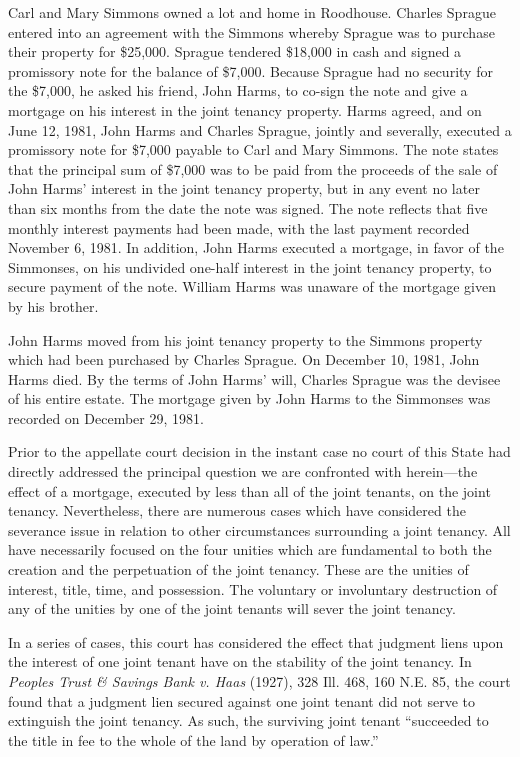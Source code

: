 Carl and Mary Simmons owned a lot and home in Roodhouse. Charles Sprague entered
into an agreement with the Simmons whereby Sprague was to purchase their
property for \$25,000. Sprague tendered \$18,000 in cash and signed a
promissory note for the balance of \$7,000. Because Sprague had no security for
the \$7,000, he asked his friend, John Harms, to co-sign the note and give a
mortgage on his interest in the joint tenancy property. Harms agreed, and on
June 12, 1981, John Harms and Charles Sprague, jointly and severally, executed
a promissory note for \$7,000 payable to Carl and Mary Simmons. The note states
that the principal sum of \$7,000 was to be paid from the proceeds of the sale
of John Harms' interest in the joint tenancy property, but in any event no
later than six months from the date the note was signed. The note reflects that
five monthly interest payments had been made, with the last payment recorded
November 6, 1981. In addition, John Harms executed a mortgage, in favor of the
Simmonses, on his undivided one-half interest in the joint tenancy property, to
secure payment of the note. William Harms was unaware of the mortgage given by
his brother.

John Harms moved from his joint tenancy property to the Simmons property which
had been purchased by Charles Sprague. On December 10, 1981, John Harms died.
By the terms of John Harms' will, Charles Sprague was the devisee of his entire
estate. The mortgage given by John Harms to the Simmonses was recorded on
December 29, 1981.

Prior to the appellate court decision in the instant case no court of this State
had directly addressed the principal question we are confronted with
herein---the
effect of a mortgage, executed by less than all of the joint tenants, on the
joint tenancy. Nevertheless, there are numerous cases which have considered the
severance issue in relation to other circumstances surrounding a joint tenancy.
All have necessarily focused on the four unities which are fundamental to both
the creation and the perpetuation of the joint tenancy. These are the unities
of interest, title, time, and possession. The voluntary or involuntary
destruction of any of the unities by one of the joint tenants will sever the
joint tenancy.

In a series of cases, this court has considered the effect that judgment liens
upon the interest of one joint tenant have on the stability of the joint
tenancy. In \emph{Peoples Trust \& Savings Bank v. Haas} (1927), 328 Ill. 468,
160 N.E. 85, the court found that a judgment lien secured against one joint
tenant did not serve to extinguish the joint tenancy. As such, the surviving
joint tenant ``succeeded to the title in fee to the whole of the land by
operation of law.''


